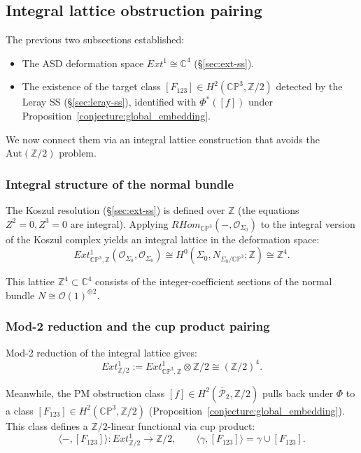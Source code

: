 \documentclass[11pt,a4paper]{article}
\theoremstyle{remark}
\newcommand{\CP}{\mathbb{CP}}
\newcommand{\C}{\mathbb{C}}
\newcommand{\Z}{\mathbb{Z}}
\newcommand{\barPP}{\overline{\mathcal{P}}}
\begin{document}
\subsection{Integral lattice obstruction pairing}
\label{sec:integral-pairing}

The previous two subsections established:
\begin{itemize}
  \item The ASD deformation space $Ext^1 \cong \C^4$
    (\S\ref{sec:ext-ss}).
  \item The existence of the target class
    $[F_{123}] \in H^2(\CP^3, \Z/2)$ detected by the Leray SS
    (\S\ref{sec:leray-ss}), identified with $\Phi^*([f])$ under
    Proposition~\ref{conjecture:global_embedding}.
\end{itemize}
We now connect them via an integral lattice construction that
avoids the $\text{Aut}(\Z/2)$ problem.

\subsubsection*{Integral structure of the normal bundle}

The Koszul resolution (\S\ref{sec:ext-ss}) is defined over $\Z$
(the equations $Z^2 = 0, Z^3 = 0$ are integral). Applying
$RHom_{\CP^3}(-, \mathcal{O}_{\Sigma_0})$ to the integral version
of the Koszul complex yields an integral lattice in the
deformation space:
\[
  Ext^1_{\CP^3, \Z}(\mathcal{O}_{\Sigma_0}, \mathcal{O}_{\Sigma_0})
  \cong H^0(\Sigma_0, N_{\Sigma_0/\CP^3}; \Z)
  \cong \Z^4.
\]

This lattice $\Z^4 \subset \C^4$ consists of the
integer-coefficient sections of the normal bundle
$N \cong \mathcal{O}(1)^{\oplus 2}$.

\subsubsection*{Mod-2 reduction and the cup product pairing}

Mod-2 reduction of the integral lattice gives:
\[
  Ext^1_{\Z/2} := Ext^1_{\CP^3, \Z} \otimes \Z/2
  \cong (\Z/2)^4.
\]

Meanwhile, the PM obstruction class $[f] \in H^2(\barPP_2, \Z/2)$
pulls back under $\Phi$ to a class
$[F_{123}] \in H^2(\CP^3, \Z/2)$
(Proposition~\ref{conjecture:global_embedding}).
This class defines a $\Z/2$-linear functional via cup product:
\[
  \langle -, [F_{123}] \rangle:
  Ext^1_{\Z/2} \longrightarrow \Z/2,
  \qquad
  \langle \gamma, [F_{123}] \rangle
  = \gamma \cup [F_{123}].
\]
\end{document}
